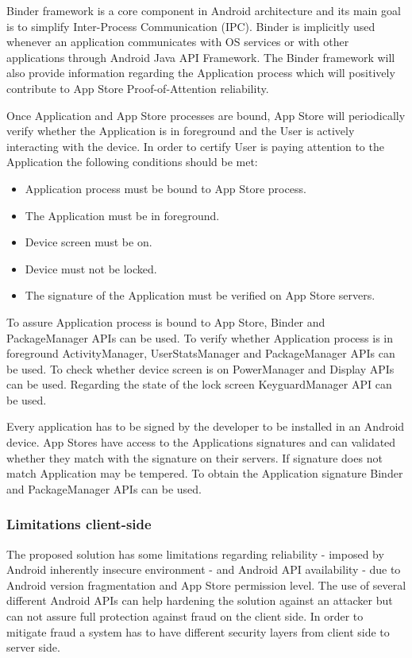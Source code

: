 Binder framework is a core component in Android architecture and its main goal is to simplify Inter-Process Communication (IPC). Binder is implicitly used whenever an application communicates with OS services or with other applications through Android Java API Framework. The Binder framework will also provide information regarding the Application process which will positively contribute to App Store Proof-of-Attention reliability.

Once Application and App Store processes are bound, App Store will periodically verify whether the Application is in foreground and the User is actively interacting with the device. In order to certify User is paying attention to the Application the following conditions should be met:

\begin{itemize}
\item Application process must be bound to App Store process.
\item The Application must be in foreground.
\item Device screen must be on.
\item Device must not be locked. 
\item The signature of the Application must be verified on App Store servers.
\end{itemize}

To assure Application process is bound to App Store, Binder and PackageManager APIs can be used. To verify whether Application process is in foreground ActivityManager, UserStatsManager and PackageManager APIs can be used. To check whether device screen is on PowerManager and Display APIs can be used. Regarding the state of the lock screen KeyguardManager API can be used. 

Every application has to be signed by the developer to be installed in an Android device. App Stores have access to the Applications signatures and can validated whether they match with the signature on their servers. If signature does not match Application may be tempered. To obtain the Application signature Binder and PackageManager APIs can be used.

\subsubsection{Limitations client-side}

The proposed solution has some limitations regarding reliability - imposed by Android inherently insecure environment - and Android API availability - due to Android version fragmentation and App Store permission level. The use of several different Android APIs can help hardening the solution against an attacker but can not assure full protection against fraud on the client side. In order to mitigate fraud a system has to have different security layers from client side to server side. 

